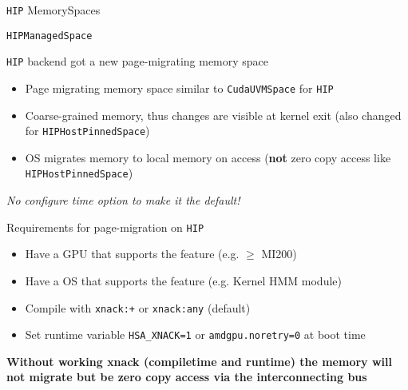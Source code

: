 

\begin{frame}[fragile]

  {\Huge \texttt{HIP} MemorySpaces}

\end{frame}



\begin{frame}[fragile]{\texttt{HIPManagedSpace}}

  {\large \texttt{HIP} backend got a new page-migrating memory space}

  \vspace{20pt}

  \begin{itemize}
    \item Page migrating memory space similar to \texttt{CudaUVMSpace} for \texttt{HIP}
    \item Coarse-grained memory, thus changes are visible at kernel exit (also changed for \texttt{HIPHostPinnedSpace})
    \item OS migrates memory to local memory on access (\textbf{not} zero copy access like \texttt{HIPHostPinnedSpace})
  \end{itemize}

  \vspace{10pt}
  \textit{No configure time option to make it the default!}

\end{frame}


\begin{frame}[fragile]

  {\large Requirements for page-migration on \texttt{HIP}}

  \begin{itemize}
    \item Have a GPU that supports the feature (e.g. $\geq$ MI200)
    \item Have a OS that supports the feature (e.g. Kernel HMM module)
    \item Compile with \texttt{xnack:+} or \texttt{xnack:any} (default)
    \item Set runtime variable \texttt{HSA\_XNACK=1} or \texttt{amdgpu.noretry=0} at boot time
  \end{itemize}

  \vspace{10pt}
  \textbf{Without working xnack (compiletime and runtime) the memory will not migrate but be zero copy access via the interconnecting bus}

\end{frame}


